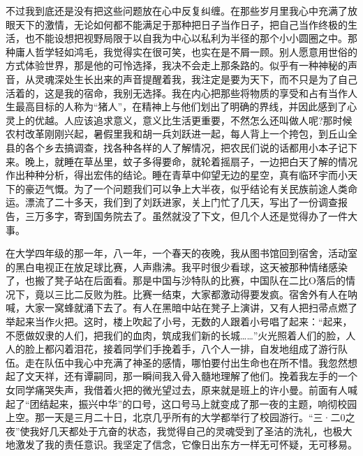\documentclass[12pt,oneside]{book}
\begin{document}
不过我到底还是没有把这些问题放在心中反复纠缠。在那些岁月里我心中充满了放眼天下的激情，无论如何都不能满足于那种把日子当作日子，把自己当作终极的生活，也不能设想把视野局限于以自我为中心以私利为半径的那个小小圆圈之中。那种庸人哲学轻如鸿毛，我觉得实在很可笑，也实在是不屑一顾。别人愿意用世俗的方式体验世界，那是他的可怜选择，我决不会走上那条路的。似乎有一种神秘的声音，从灵魂深处生长出来的声音提醒着我，我注定是要为天下，而不只是为了自己活着的，这是我的宿命，我别无选择。我在内心把那些将物质的享受和占有当作人生最高目标的人称为``猪人''，在精神上与他们划出了明确的界线，并因此感到了心灵上的优越。人应该追求意义，意义比生活更重要，不然怎么还叫做人呢?那时候农村改革刚刚兴起，暑假里我和胡一兵刘跃进一起，每人背上一个挎包，到丘山全县的各个乡去搞调查，找各种各样的人了解情况，把农民们说的话都用小本子记下来。晚上，就睡在草丛里，蚊子多得要命，就轮着摇扇子，一边把白天了解的情况作出种种分析，得出宏伟的结论。睡在青草中仰望无边的星空，真有临环宇而小天下的豪迈气慨。为了一个问题我们可以争上大半夜，似乎结论有关民族前途人类命运。漂流了二十多天，我们到了刘跃进家，关上门忙了几天，写出了一份调查报告，三万多字，寄到国务院去了。虽然就没了下文，但几个人还是觉得办了一件大事。

在大学四年级的那一年，八一年，一个春天的夜晚，我从图书馆回到宿舍，活动室的黑白电视正在放足球比赛，人声鼎沸。我平时很少看球，这天被那种情绪感染了，也搬了凳子站在后面看。那是中国与沙特队的比赛，中国队在二比O落后的情况下，竟以三比二反败为胜。比赛一结束，大家都激动得要发疯。宿舍外有人在呐喊，大家一窝蜂就涌下去了。有人在黑暗中站在凳子上演讲，又有人把扫帚点燃了举起来当作火把。这时，楼上吹起了小号，无数的人跟着小号唱了起来：``起来，不愿做奴隶的人们，把我们的血肉，筑成我们新的长城\ldots\ldots{}''火光照着人们的脸，人人的脸上都闪着泪花，接着同学们手挽着手，八个人一排，自发地组成了游行队伍。走在队伍中我心中充满了神圣的感情，哪怕要付出生命也在所不惜。我忽然想起了文天祥，还有谭嗣同，那一瞬间我入骨入髓地理解了他们。挽着我左手的一个女同学痛哭失声，我借着火把的微光望过去，原来就是班上的许小曼。前面有人喊起了``团结起来，振兴中华''的口号，这口号马上就变成了那一夜的主题，响彻校园上空。那一天是三月二十日，北京几乎所有的大学都举行了校园游行。``三·二0之夜''使我好几天都处于亢奋的状态，我觉得自己的灵魂受到了圣洁的洗礼，也极大地激发了我的责任意识。我坚定了信念，它像日出东方一样无可怀疑，无可移易。
\end{document}
